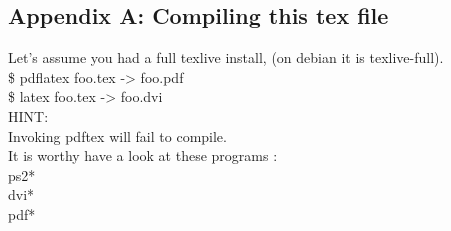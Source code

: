 \documentclass{article}
\begin{document}
\begin{CJK}{UTF8}{gbsn}
\newpage
\appendix
\section{Appendix A: Compiling this tex file}
Let's assume you had a full texlive install, (on debian it is texlive-full).\\
\indent \$ pdflatex foo.tex -> foo.pdf\\
\indent \$ latex foo.tex -> foo.dvi\\
HINT:\\
Invoking pdftex will fail to compile.\\
It is worthy have a look at these programs :\\
\indent ps2*\\
\indent dvi*\\
\indent pdf*\\


\end{CJK}
\end{document}
